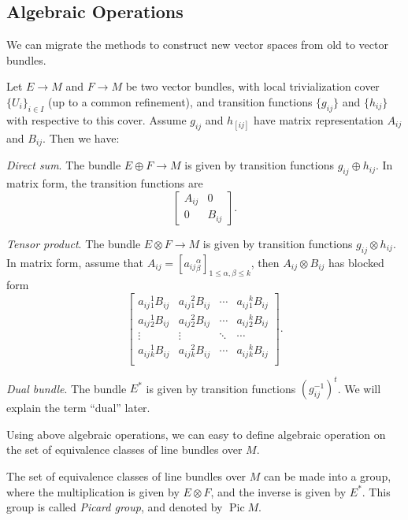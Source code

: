 \subsection*{Algebraic Operations}

We can migrate the methods to construct new vector spaces from old to vector bundles.

Let $E\to M$ and $F\to M$ be two vector bundles, with local trivialization cover $\{U_i\}_{i\in I}$ (up to a common refinement), and transition functions $\{g_{ij}\}$ and $\{h_{ij}\}$ with respective to this cover.
Assume $g_{ij}$ and $h_[ij]$ have matrix representation $A_{ij}$ and $B_{ij}$.
Then we have:

\noindent\emph{Direct sum}.
The bundle $E\oplus F\to M$ is given by transition functions $g_{ij}\oplus h_{ij}$.
In matrix form, the transition functions are
\[\begin{bmatrix}
    A_{ij} & 0 \\
    0 & B_{ij}
\end{bmatrix}.\]

\noindent\emph{Tensor product}.
The bundle $E\otimes F\to M$ is given by transition functions $g_{ij}\otimes h_{ij}$.
In matrix form, assume that $A_{ij}=[a_{ij}{}^\alpha_\beta]_{1\leq\alpha,\beta\leq k}$, then $A_{ij}\otimes B_{ij}$ has blocked form
\[\begin{bmatrix}
    a_{ij}{}^1_1B_{ij} & a_{ij}{}^2_1B_{ij} & \cdots & a_{ij}{}^k_1B_{ij} \\
    a_{ij}{}^1_2B_{ij} & a_{ij}{}^2_2B_{ij} & \cdots & a_{ij}{}^k_2B_{ij} \\
    \vdots & \vdots & \ddots & \cdots \\
    a_{ij}{}^1_kB_{ij} & a_{ij}{}^2_kB_{ij} & \cdots & a_{ij}{}^k_kB_{ij} \\
\end{bmatrix}.\]

\noindent\emph{Dual bundle}.
The bundle $E^*$ is given by transition functions $(g_{ij}^{-1})^t$.
We will explain the term ``dual'' later.

Using above algebraic operations, we can easy to define algebraic operation on the set of equivalence classes of line bundles over $M$.
\begin{prop}
    The set of equivalence classes of line bundles over $M$ can be made into a group, where the multiplication is given by $E\otimes F$, and the inverse is given by $E^*$.
    This group is called \emph{Picard group}, and denoted by $\operatorname{Pic}M$.
\end{prop}

